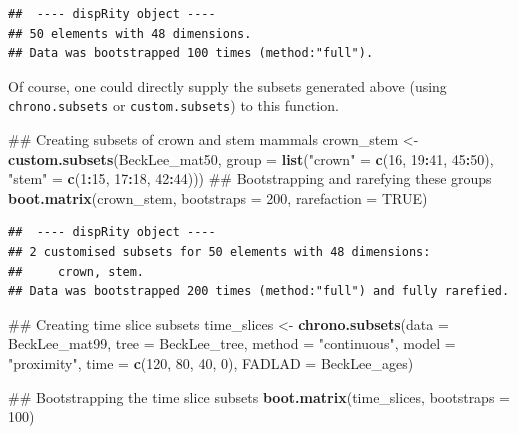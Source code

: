 \documentclass[]{book}
\newenvironment{Shaded}{\begin{snugshade}}{\end{snugshade}}
\newcommand{\KeywordTok}[1]{\textcolor[rgb]{0.13,0.29,0.53}{\textbf{#1}}}
\newcommand{\DataTypeTok}[1]{\textcolor[rgb]{0.13,0.29,0.53}{#1}}
\newcommand{\DecValTok}[1]{\textcolor[rgb]{0.00,0.00,0.81}{#1}}
\newcommand{\StringTok}[1]{\textcolor[rgb]{0.31,0.60,0.02}{#1}}
\newcommand{\OtherTok}[1]{\textcolor[rgb]{0.56,0.35,0.01}{#1}}
\newcommand{\OperatorTok}[1]{\textcolor[rgb]{0.81,0.36,0.00}{\textbf{#1}}}
\newcommand{\NormalTok}[1]{#1}
\theoremstyle{definition}
\theoremstyle{definition}
\theoremstyle{definition}
\theoremstyle{remark}
\begin{document}
\begin{verbatim}
##  ---- dispRity object ---- 
## 50 elements with 48 dimensions.
## Data was bootstrapped 100 times (method:"full").
\end{verbatim}

Of course, one could directly supply the subsets generated above (using
\texttt{chrono.subsets} or \texttt{custom.subsets}) to this function.

\begin{Shaded}
\begin{Highlighting}[]
\NormalTok{## Creating subsets of crown and stem mammals}
\NormalTok{crown_stem <-}\StringTok{ }\KeywordTok{custom.subsets}\NormalTok{(BeckLee_mat50,}
                                \DataTypeTok{group =} \KeywordTok{list}\NormalTok{(}\StringTok{"crown"}\NormalTok{ =}\StringTok{ }\KeywordTok{c}\NormalTok{(}\DecValTok{16}\NormalTok{, }\DecValTok{19}\OperatorTok{:}\DecValTok{41}\NormalTok{, }\DecValTok{45}\OperatorTok{:}\DecValTok{50}\NormalTok{), }
                                             \StringTok{"stem"}\NormalTok{ =}\StringTok{ }\KeywordTok{c}\NormalTok{(}\DecValTok{1}\OperatorTok{:}\DecValTok{15}\NormalTok{, }\DecValTok{17}\OperatorTok{:}\DecValTok{18}\NormalTok{, }\DecValTok{42}\OperatorTok{:}\DecValTok{44}\NormalTok{)))}
\NormalTok{## Bootstrapping and rarefying these groups}
\KeywordTok{boot.matrix}\NormalTok{(crown_stem, }\DataTypeTok{bootstraps =} \DecValTok{200}\NormalTok{, }\DataTypeTok{rarefaction =} \OtherTok{TRUE}\NormalTok{)}
\end{Highlighting}
\end{Shaded}

\begin{verbatim}
##  ---- dispRity object ---- 
## 2 customised subsets for 50 elements with 48 dimensions:
##     crown, stem.
## Data was bootstrapped 200 times (method:"full") and fully rarefied.
\end{verbatim}

\begin{Shaded}
\begin{Highlighting}[]
\NormalTok{## Creating time slice subsets}
\NormalTok{time_slices <-}\StringTok{ }\KeywordTok{chrono.subsets}\NormalTok{(}\DataTypeTok{data =}\NormalTok{ BeckLee_mat99, }\DataTypeTok{tree =}\NormalTok{ BeckLee_tree, }
                               \DataTypeTok{method =} \StringTok{"continuous"}\NormalTok{, }\DataTypeTok{model =} \StringTok{"proximity"}\NormalTok{, }
                               \DataTypeTok{time =} \KeywordTok{c}\NormalTok{(}\DecValTok{120}\NormalTok{, }\DecValTok{80}\NormalTok{, }\DecValTok{40}\NormalTok{, }\DecValTok{0}\NormalTok{),}
                               \DataTypeTok{FADLAD =}\NormalTok{ BeckLee_ages)}

\NormalTok{## Bootstrapping the time slice subsets}
\KeywordTok{boot.matrix}\NormalTok{(time_slices, }\DataTypeTok{bootstraps =} \DecValTok{100}\NormalTok{)}
\end{Highlighting}
\end{Shaded}
\end{document}
